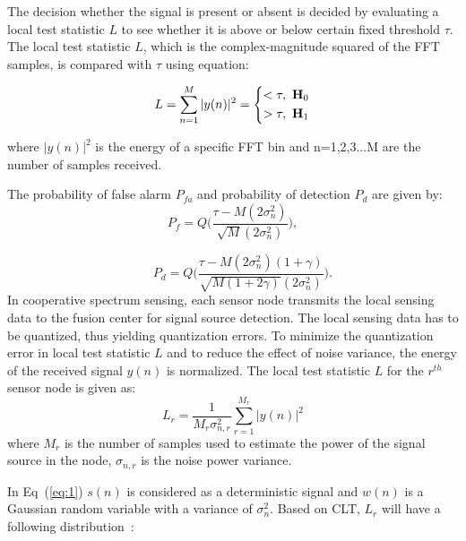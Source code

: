 The decision whether the signal is present or absent is decided by evaluating a local test statistic $L$ to see whether it is above or below certain fixed threshold $\tau$. 
The local test statistic $L$, which is the complex-magnitude squared of the FFT samples, is compared with $\tau$ using equation:

\begin{equation}
\label{eq:2}
	L = \sum_{n=1}^{M}{|y(n)|^2} = 
	\left\{
	\begin{aligned}
		<\tau,~\mathbf{H}_0 \\
		>\tau,~\mathbf{H}_1		
	\end{aligned}
	\right.
\end{equation}

where $|y(n)|^2$ is the energy of a specific FFT bin and n=1,2,3...M are the number of samples received.

The probability of false alarm $P_{fa}$ and probability of detection $P_d$ are given by:
\begin{equation}
\label{eq:3}
P_f = Q\Bigg(\dfrac{\tau-M(2\sigma_n^2)}{\sqrt{M}(2\sigma_n^2)}\Bigg),
\end{equation}

\begin{equation}
\label{eq:4}
~~~~~~~P_d = Q\Bigg(\dfrac{\tau-M(2\sigma_n^2)(1+\gamma)}{\sqrt{M(1+2\gamma)}(2\sigma_n^2)}\Bigg).
\end{equation}
In cooperative spectrum sensing, each sensor node transmits the local sensing data to the fusion center for signal source detection. The local sensing data has to be quantized, thus yielding quantization errors. To minimize the quantization error in local test statistic $L$ and to reduce the effect of noise variance, the energy of the received signal $y(n)$ is normalized\cite{arhtn13}. The local test statistic $L$ for the $r^{th}$ sensor node is given as:
\begin{equation}
	\label{eq:5}
	L_r = \dfrac{1}{M_r\sigma_{n,r}^2}\sum_{r=1}^{M_r}|y(n)|^2
\end{equation}
where $M_r$ is the number of samples used to estimate the power of the signal source in the node,  $\sigma_{n,r}$ is the noise power variance.

In Eq~(\ref{eq:1}) $s(n)$ is considered as a deterministic signal and $w(n)$ is a Gaussian random variable with a variance of $\sigma_n^2$. Based on CLT, $L_r$ will have a following distribution~\cite{inphtn7}:

